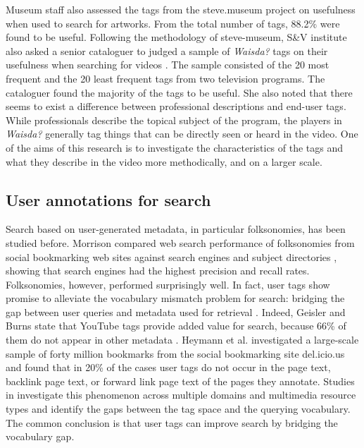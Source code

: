 Museum staff also assessed the tags from the steve.museum project on usefulness when used to search for artworks. From the total number of tags, 88.2\% were found to be useful. Following the methodology of steve-museum, S\&V institute also asked a senior cataloguer to judged a sample of \emph{Waisda?} tags on their usefulness when searching for videos \cite{johanwebsci}. The sample consisted of the 20 most frequent and the 20 least frequent tags from two television programs. The cataloguer found the majority of the tags to be useful. She also noted that there seems to exist a difference between professional descriptions and end-user tags. While professionals describe the topical subject of the program, the players in \emph{Waisda?} generally tag things that can be directly seen or heard in the video. One of the aims of this research is to investigate the characteristics of the tags and what they describe in the video more methodically, and on a larger scale.

\subsection{User annotations for search}
Search based on user-generated metadata, in particular folksonomies, has been studied before. Morrison compared web search performance of folksonomies from social bookmarking web sites against search engines and subject directories \cite{morison}, showing that search engines had the highest precision and recall rates. Folksonomies, however, performed surprisingly well. In fact, user tags show promise to alleviate the vocabulary mismatch problem for search: bridging the gap between user queries and metadata used for retrieval \cite{vocprob}. Indeed, Geisler and Burns state that YouTube tags provide added value for search, because 66\% of them do not appear in  other metadata \cite{youtube}. Heymann et al. investigated a large-scale sample of forty million bookmarks from the social bookmarking site del.icio.us and found that in 20\% of the cases user tags do not occur in the page text, backlink page text, or forward link page text of the pages they annotate. Studies in \cite{Bischoff:2010:BGT:1833903.1834001,Halvey:2007:AOV:1286240.1286301,journals/jasis/Rorissa10,Yanbe:2007:SBE:1255175.1255198} investigate this phenomenon across multiple domains and multimedia resource types and identify the gaps between the tag space and the querying vocabulary. The common conclusion is that user tags can improve search by bridging the vocabulary gap. 

